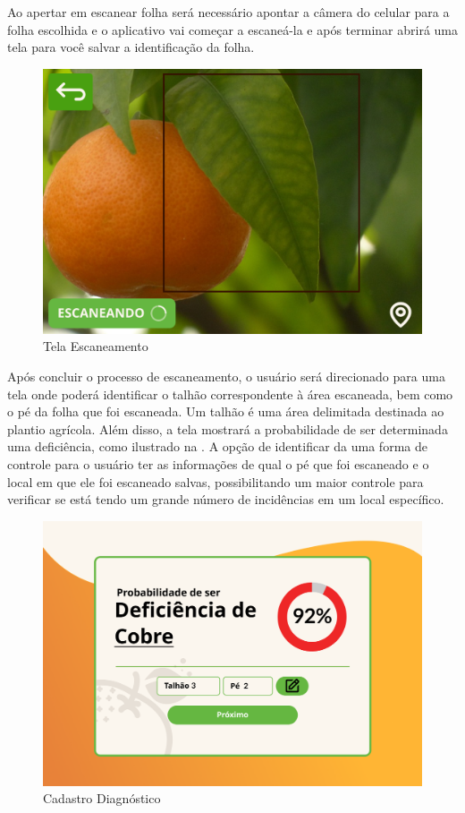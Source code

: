 Ao apertar em escanear folha  será necessário apontar a câmera do celular para a folha escolhida e o aplicativo vai começar a escaneá-la e após terminar abrirá uma tela para você salvar a identificação da folha.


\begin{figure}[H]
\centering
\caption{Tela Escaneamento}%
\label{fig:tela-escaneamento}
\includegraphics[width=0.8\linewidth]{Illustrations/Tela-Escaneamento.png}
\end{figure}

Após concluir o processo de escaneamento, o usuário será direcionado para uma tela onde poderá identificar o talhão correspondente à área escaneada, bem como o pé da folha que foi escaneada. Um talhão é uma área delimitada destinada ao plantio agrícola. Além disso, a tela mostrará a probabilidade de ser determinada uma deficiência, como ilustrado na . A opção de identificar da uma forma de controle para o usuário ter as informações de qual o pé que foi escaneado e o local em que ele foi escaneado salvas, possibilitando um maior controle para verificar se está tendo um grande número de incidências em um local específico.

\begin{figure}[H]
\centering
\caption{Cadastro Diagnóstico}%
\label{fig:cadastro-diagnóstico}
\includegraphics[width=0.8\linewidth]{Illustrations/Cadastro-diagnostico.png}
\end{figure}

